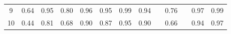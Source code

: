 \documentclass[twoside,11pt]{article}
\begin{document}
\begin{table}[H]
{\begin{tabular}{cccccccclclcc}
\multicolumn{1}{|c|}{9}                                                                           & \multicolumn{1}{c|}{0.64}                                                           & \multicolumn{1}{c|}{0.95}                                                                      & \multicolumn{1}{c|}{0.80}                                                                & \multicolumn{1}{c|}{\cellcolor[HTML]{ECF4FF}0.96}                                        & \multicolumn{1}{c|}{0.95}                                                                & \multicolumn{1}{c|}{\cellcolor[HTML]{FFCCC9}0.99}                                           & \multicolumn{1}{c|}{0.94}                                                                   & \multicolumn{1}{l|}{}                                                                          & \multicolumn{1}{c|}{0.76}                                                                   & \multicolumn{1}{l|}{}                    & \multicolumn{1}{c|}{0.97}                                                                      & \multicolumn{1}{c|}{0.99}                                                                      \\ \cline{1-1}
\multicolumn{1}{|c|}{10}                                                                          & \multicolumn{1}{c|}{0.44}                                                           & \multicolumn{1}{c|}{0.81}                                                                      & \multicolumn{1}{c|}{0.68}                                                                & \multicolumn{1}{c|}{\cellcolor[HTML]{ECF4FF}0.90}                                        & \multicolumn{1}{c|}{0.87}                                                                & \multicolumn{1}{c|}{\cellcolor[HTML]{FFCCC9}0.95}                                           & \multicolumn{1}{c|}{\cellcolor[HTML]{ECF4FF}0.90}                                           & \multicolumn{1}{l|}{}                                                                          & \multicolumn{1}{c|}{0.66}                                                                   & \multicolumn{1}{l|}{}                    & \multicolumn{1}{c|}{0.94}                                                                      & \multicolumn{1}{c|}{0.97}                                                                      \\ \cline{1-1}

\end{tabular}}
\end{table}
\end{document}
